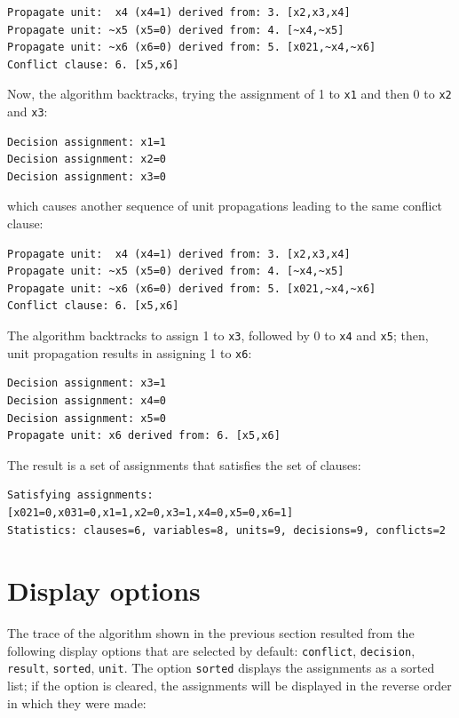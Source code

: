 \documentclass[11pt]{report}
\newcommand*{\p}[1]{\textup{\texttt{#1}}}
\begin{document}
\begin{verbatim}
Propagate unit:  x4 (x4=1) derived from: 3. [x2,x3,x4]
Propagate unit: ~x5 (x5=0) derived from: 4. [~x4,~x5]
Propagate unit: ~x6 (x6=0) derived from: 5. [x021,~x4,~x6]
Conflict clause: 6. [x5,x6]
\end{verbatim}

Now, the algorithm backtracks, trying the assignment of 1 to \p{x1} and
then 0 to \p{x2} and \p{x3}:
\begin{verbatim}
Decision assignment: x1=1
Decision assignment: x2=0
Decision assignment: x3=0
\end{verbatim}
which causes another sequence of unit propagations leading to the same
conflict clause:
\begin{verbatim}
Propagate unit:  x4 (x4=1) derived from: 3. [x2,x3,x4]
Propagate unit: ~x5 (x5=0) derived from: 4. [~x4,~x5]
Propagate unit: ~x6 (x6=0) derived from: 5. [x021,~x4,~x6]
Conflict clause: 6. [x5,x6]
\end{verbatim}

The algorithm backtracks to assign 1 to \p{x3}, followed by 0 to \p{x4}
and \p{x5}; then, unit propagation results in assigning 1 to \p{x6}:

\begin{verbatim}
Decision assignment: x3=1
Decision assignment: x4=0
Decision assignment: x5=0
Propagate unit: x6 derived from: 6. [x5,x6]
\end{verbatim}

The result is a set of assignments that satisfies the set of clauses:

\begin{verbatim}
Satisfying assignments:
[x021=0,x031=0,x1=1,x2=0,x3=1,x4=0,x5=0,x6=1]
Statistics: clauses=6, variables=8, units=9, decisions=9, conflicts=2
\end{verbatim}

\newpage

\section{Display options}

The trace of the algorithm shown in the previous section resulted from
the following display options that are selected by default:
\p{conflict}, \p{decision}, \p{result}, \p{sorted}, \p{unit}. The option
\p{sorted} displays the assignments as a sorted list; if the option is
cleared, the assignments will be displayed in the reverse order in which
they were made:
\end{document}
